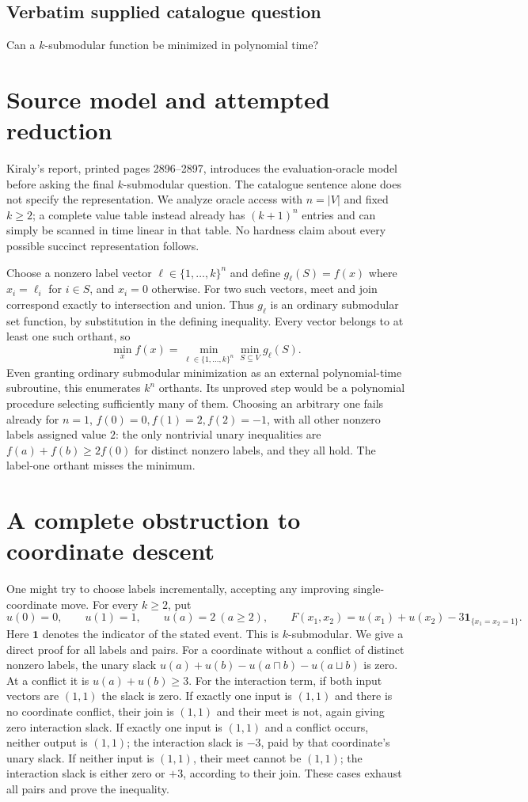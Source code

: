 \documentclass[11pt]{article}
\begin{document}
\subsection{Verbatim supplied catalogue question}
Can a $k$-submodular function be minimized in polynomial time?

\section{Source model and attempted reduction}
Kiraly's report, printed pages 2896--2897, introduces the evaluation-oracle
model before asking the final $k$-submodular question. The catalogue sentence
alone does not specify the representation. We analyze oracle access with
$n=|V|$ and fixed $k\ge2$; a complete value table instead already has
$(k+1)^n$ entries and can simply be scanned in time linear in that table.
No hardness claim about every possible succinct representation follows.

Choose a nonzero label vector $\ell\in\{1,\ldots,k\}^n$ and define
$g_\ell(S)=f(x)$ where $x_i=\ell_i$ for $i\in S$, and $x_i=0$ otherwise.
For two such vectors, meet and join correspond exactly to intersection and
union. Thus $g_\ell$ is an ordinary submodular set function, by substitution
in the defining inequality. Every vector belongs to at least one such orthant,
so
\[
\min_x f(x)=\min_{\ell\in\{1,\ldots,k\}^n}\min_{S\subseteq V}g_\ell(S).
\]
Even granting ordinary submodular minimization as an external polynomial-time
subroutine, this enumerates $k^n$ orthants. Its unproved step would be a
polynomial procedure selecting sufficiently many of them. Choosing an arbitrary
one fails already for $n=1$, $f(0)=0,f(1)=2,f(2)=-1$, with all other nonzero
labels assigned value $2$: the only nontrivial unary inequalities are
$f(a)+f(b)\ge2f(0)$ for distinct nonzero labels, and they all hold. The
label-one orthant misses the minimum.

\section{A complete obstruction to coordinate descent}
One might try to choose labels incrementally, accepting any improving
single-coordinate move. For every $k\ge2$, put
\[
u(0)=0,\qquad u(1)=1,\qquad u(a)=2\ (a\ge2),\qquad
F(x_1,x_2)=u(x_1)+u(x_2)-3\mathbf1_{\{x_1=x_2=1\}}.
\]
Here $\mathbf1$ denotes the indicator of the stated event. This is
$k$-submodular. We give a direct proof for all labels and pairs.
For a coordinate without a conflict of distinct nonzero labels, the unary
slack $u(a)+u(b)-u(a\sqcap b)-u(a\sqcup b)$ is zero.
At a conflict it is $u(a)+u(b)\ge3$.
For the interaction term, if both input vectors are $(1,1)$ the slack is zero.
If exactly one input is $(1,1)$ and there is no coordinate conflict, their join
is $(1,1)$ and their meet is not, again giving zero interaction slack.
If exactly one input is $(1,1)$ and a conflict occurs, neither output is
$(1,1)$; the interaction slack is $-3$, paid by that coordinate's unary
slack. If neither input is $(1,1)$, their meet cannot be $(1,1)$; the
interaction slack is either zero or $+3$, according to their join.
These cases exhaust all pairs and prove the inequality.
\end{document}
